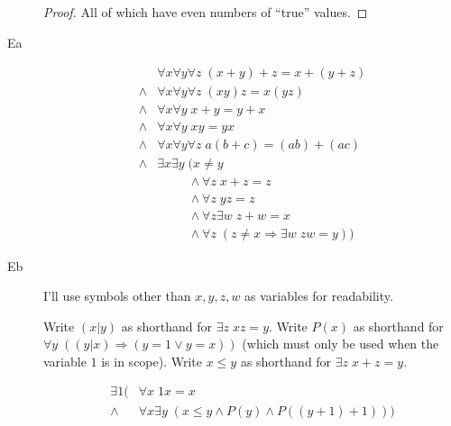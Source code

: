 \documentclass[12pt]{article}
\begin{document}
\begin{description}
\begin{proof}
  All of which have even numbers of ``true'' values.
  \end{proof}

\item[Ea] 
  \begin{align*}
           & \forall x \forall y \forall z\; (x+y)+z=x+(y+z) \\
	\wedge & \forall x \forall y \forall z\; (xy)z = x(yz) \\
	\wedge & \forall x \forall y\; x+y=y+x \\
	\wedge & \forall x \forall y\; xy=yx \\
	\wedge & \forall x \forall y \forall z\; a(b+c) = (ab)+(ac) \\
	\wedge & \exists x \exists y\; (x \ne y \\
	       & \phantom{\exists x \exists y\;} \wedge \forall z\; x+z=z \\
		   & \phantom{\exists x \exists y\;} \wedge \forall z\; yz=z \\
		   & \phantom{\exists x \exists y\;} \wedge \forall z \exists w\; z+w=x \\
		   & \phantom{\exists x \exists y\;} \wedge \forall z\; (z \ne x \Rightarrow \exists w\; zw=y))
  \end{align*}

\item[Eb]  I'll use symbols other than $x,y,z,w$ as variables for readability.

  Write $(x|y)$ as shorthand for $\exists z\; xz=y$.  Write $P(x)$ as shorthand
  for $\forall y\; ((y|x) \Rightarrow (y=1 \vee y=x))$ (which must only be used
  when the variable $1$ is in scope).  Write $x \le y$ as shorthand for
  $\exists z\; x+z=y$.

  \begin{equation*}
  \begin{split}
    \exists 1 (&\forall x\; 1x=x \\
               \wedge &\forall x \exists y\; (x \le y \wedge P(y) \wedge P((y+1)+1)))
  \end{split}
  \end{equation*}
\end{description}
\end{document}
